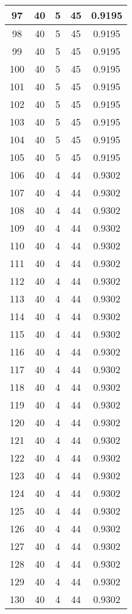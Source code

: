 \documentclass[letterpaper, 12pt]{article}
\begin{document}
\begin{longtable}{|c|c|c|c|c|}
\hline
97 & 40 & 5 & 45 & 0.9195 \\
\hline
98 & 40 & 5 & 45 & 0.9195 \\
\hline
99 & 40 & 5 & 45 & 0.9195 \\
\hline
100 & 40 & 5 & 45 & 0.9195 \\
\hline
101 & 40 & 5 & 45 & 0.9195 \\
\hline
102 & 40 & 5 & 45 & 0.9195 \\
\hline
103 & 40 & 5 & 45 & 0.9195 \\
\hline
104 & 40 & 5 & 45 & 0.9195 \\
\hline
105 & 40 & 5 & 45 & 0.9195 \\
\hline
106 & 40 & 4 & 44 & 0.9302 \\
\hline
107 & 40 & 4 & 44 & 0.9302 \\
\hline
108 & 40 & 4 & 44 & 0.9302 \\
\hline
109 & 40 & 4 & 44 & 0.9302 \\
\hline
110 & 40 & 4 & 44 & 0.9302 \\
\hline
111 & 40 & 4 & 44 & 0.9302 \\
\hline
112 & 40 & 4 & 44 & 0.9302 \\
\hline
113 & 40 & 4 & 44 & 0.9302 \\
\hline
114 & 40 & 4 & 44 & 0.9302 \\
\hline
115 & 40 & 4 & 44 & 0.9302 \\
\hline
116 & 40 & 4 & 44 & 0.9302 \\
\hline
117 & 40 & 4 & 44 & 0.9302 \\
\hline
118 & 40 & 4 & 44 & 0.9302 \\
\hline
119 & 40 & 4 & 44 & 0.9302 \\
\hline
120 & 40 & 4 & 44 & 0.9302 \\
\hline
121 & 40 & 4 & 44 & 0.9302 \\
\hline
122 & 40 & 4 & 44 & 0.9302 \\
\hline
123 & 40 & 4 & 44 & 0.9302 \\
\hline
124 & 40 & 4 & 44 & 0.9302 \\
\hline
125 & 40 & 4 & 44 & 0.9302 \\
\hline
126 & 40 & 4 & 44 & 0.9302 \\
\hline
127 & 40 & 4 & 44 & 0.9302 \\
\hline
128 & 40 & 4 & 44 & 0.9302 \\
\hline
129 & 40 & 4 & 44 & 0.9302 \\
\hline
130 & 40 & 4 & 44 & 0.9302 \\

\end{longtable}
\end{document}
